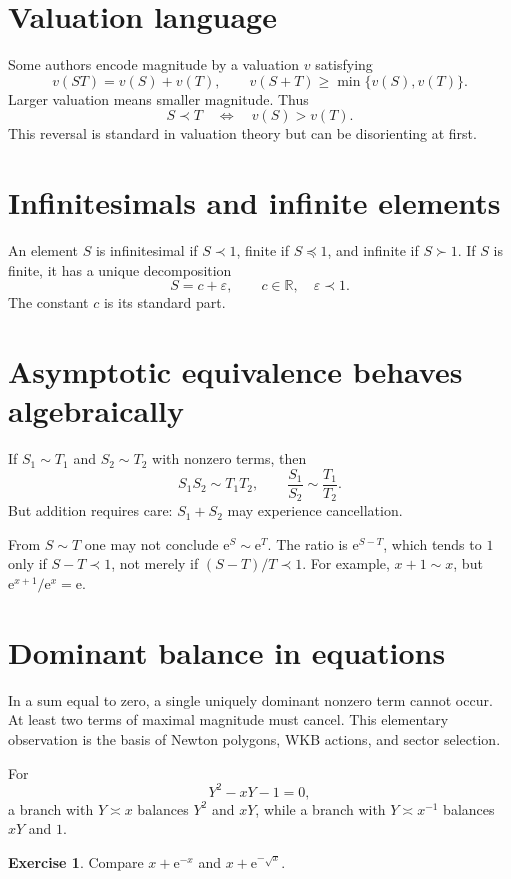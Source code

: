 \documentclass[11pt,oneside,openany]{book}
\newcommand{\R}{\mathbb{R}}
\newcommand{\e}{\mathrm{e}}
\newcommand{\eps}{\varepsilon}
\theoremstyle{plain}
\theoremstyle{definition}
\newtheorem{exercise}{Exercise}[chapter]
\theoremstyle{remark}
\begin{document}
\section{Valuation language}
Some authors encode magnitude by a valuation $v$ satisfying
\[
  v(ST)=v(S)+v(T),
  \qquad
  v(S+T)\ge\min\{v(S),v(T)\}.
\]
Larger valuation means smaller magnitude. Thus
\[
  S\prec T\quad\Longleftrightarrow\quad v(S)>v(T).
\]
This reversal is standard in valuation theory but can be disorienting at first.

\section{Infinitesimals and infinite elements}
An element $S$ is infinitesimal if $S\prec1$, finite if $S\preccurlyeq1$, and infinite if $S\succ1$. If $S$ is finite, it has a unique decomposition
\[
  S=c+\eps,
  \qquad c\in\R,
  \quad\eps\prec1.
\]
The constant $c$ is its standard part.

\section{Asymptotic equivalence behaves algebraically}
If $S_1\sim T_1$ and $S_2\sim T_2$ with nonzero terms, then
\[
  S_1S_2\sim T_1T_2,
  \qquad
  \frac{S_1}{S_2}\sim\frac{T_1}{T_2}.
\]
But addition requires care: $S_1+S_2$ may experience cancellation.

\begin{warningbox}
From $S\sim T$ one may not conclude $\e^S\sim\e^T$. The ratio is $\e^{S-T}$, which tends to $1$ only if $S-T\prec1$, not merely if $(S-T)/T\prec1$. For example, $x+1\sim x$, but $\e^{x+1}/\e^x=\e$.
\end{warningbox}

\section{Dominant balance in equations}
In a sum equal to zero, a single uniquely dominant nonzero term cannot occur. At least two terms of maximal magnitude must cancel. This elementary observation is the basis of Newton polygons, WKB actions, and sector selection.

For
\[
  Y^2-xY-1=0,
\]
a branch with $Y\asymp x$ balances $Y^2$ and $xY$, while a branch with $Y\asymp x^{-1}$ balances $xY$ and $1$.

\begin{exercise}
Compare $x+\e^{-x}$ and $x+\e^{-\sqrt{x}}$.
\end{exercise}
\end{document}
